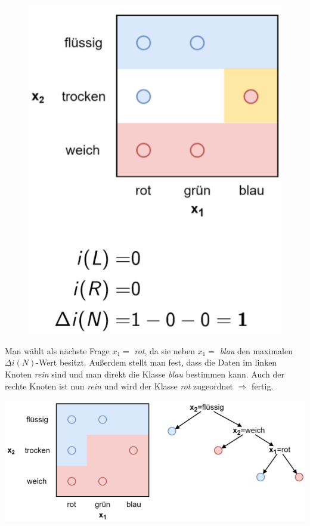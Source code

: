 \documentclass{report}
\begin{document}
\begin{figure}[H]
\begin{minipage}[b]{0.4\textwidth}
    \end{minipage}	
  \end{figure}	
  
  \begin{figure}[H]	
    \centering	
    \begin{minipage}[b]{0.4\textwidth}	
      \includegraphics[scale=.235]{ml07_23}	
    \end{minipage}	
  \end{figure}	
  
  Man wählt als nächste Frage $x_1 = $ \textit{rot}, da sie neben $x_1 = $ \textit{blau} den maximalen	
  $\Delta i(N)$-Wert besitzt. Außerdem stellt man fest, dass die Daten im linken Knoten \textit{rein}	
  sind und man direkt die Klasse \textit{blau} bestimmen kann. Auch der rechte Knoten ist nun \textit{rein}	
  und wird der Klasse \textit{rot} zugeordnet $\Rightarrow$ fertig.	
  
  \begin{center}	
    \includegraphics[scale=.3]{ml07_24}	
  \end{center}	
  
\end{document}

